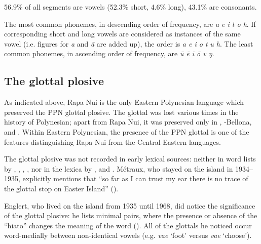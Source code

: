 56.9\% of all segments are vowels (52.3\% short, 4.6\% long), 43.1\% are consonants.

The most common phonemes, in descending order of frequency, are \textit{a e i t o {\ꞌ} h}. If corresponding short and long vowels are considered as instances of the same vowel (i.e. figures for \textit{a} and \textit{ā} are added up), the order is \textit{a e i o t {\ꞌ}} \textit{u h}. The least common phonemes, in ascending order of frequency, are \textit{ū ē ī ō v ŋ}.

\subsection{The glottal plosive}\label{sec:2.2.4}
As indicated above, Rapa Nui is the only Eastern Polynesian language which preserved the PPN glottal plosive. The glottal was lost various times in the history of Polynesian; apart from Rapa Nui, it was preserved only in , -Bellona,  and . Within Eastern Polynesian, the presence of the PPN glottal is one of the features distinguishing Rapa Nui from the Central-Eastern languages.

The glottal plosive was not recorded in early lexical sources: neither in word lists by \citet{Philippi1873}, \citet{Geiseler1883}, \citet{Thomson1889}, \citet{Cooke1899}, nor in the lexica by \citet{Roussel1908,Roussel1917}, \citet{Churchill1912} and \citet{Martínez1913}. Métraux, who stayed on the island in 1934–1935, explicitly mentions that “so far as I can trust my ear there is no trace of the glottal stop on Easter Island” (\citealt[32]{Métraux1971}).

Englert, who lived on the island from 1935 until 1968, did notice the significance of the glottal plosive: he lists minimal pairs, where the presence or absence of the “hiato” changes the meaning of the word (\citealt[16]{Englert1978}). All of the glottals he noticed occur word-medially between non-identical vowels (e.g. \textit{va{\ꞌ}e} ‘foot’ versus \textit{vae} ‘choose’).

